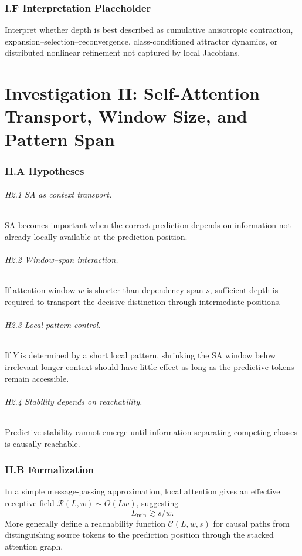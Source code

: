 \documentclass[10pt]{article}
\begin{document}
\section{I.F Interpretation Placeholder}
Interpret whether depth is best described as cumulative anisotropic contraction, expansion--selection--reconvergence, class-conditioned attractor dynamics, or distributed nonlinear refinement not captured by local Jacobians.

\part{Investigation II: Self-Attention Transport, Window Size, and Pattern Span}
\section{II.A Hypotheses}
\paragraph{H2.1 SA as context transport.} SA becomes important when the correct prediction depends on information not already locally available at the prediction position.
\paragraph{H2.2 Window--span interaction.} If attention window $w$ is shorter than dependency span $s$, sufficient depth is required to transport the decisive distinction through intermediate positions.
\paragraph{H2.3 Local-pattern control.} If $Y$ is determined by a short local pattern, shrinking the SA window below irrelevant longer context should have little effect as long as the predictive tokens remain accessible.
\paragraph{H2.4 Stability depends on reachability.} Predictive stability cannot emerge until information separating competing classes is causally reachable.

\section{II.B Formalization}
In a simple message-passing approximation, local attention gives an effective receptive field $\mathcal{R}(L,w)\sim O(Lw)$, suggesting
\begin{equation}L_{\min}\gtrsim s/w.\end{equation}
More generally define a reachability function $\mathcal{C}(L,w,s)$ for causal paths from distinguishing source tokens to the prediction position through the stacked attention graph.
\end{document}
